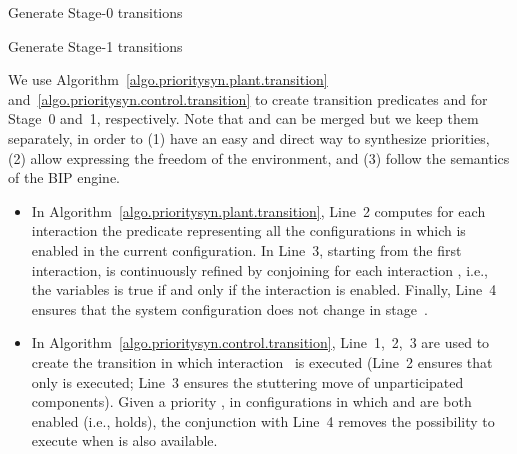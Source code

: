 \documentclass[10pt, a4paper, onecolumn, conference, compsocconf]{IEEEtran}
\begin{document}
\begin{algorithm}[H]
\DontPrintSemicolon
{}
\caption{Generate Stage-0 transitions\label{algo.prioritysyn.plant.transition}}
\end{algorithm}

\begin{algorithm}[H]
\DontPrintSemicolon
{}

\caption{Generate Stage-1 transitions\label{algo.prioritysyn.control.transition}}
\end{algorithm}

We use Algorithm~\ref{algo.prioritysyn.plant.transition}
and~\ref{algo.prioritysyn.control.transition} to create transition
predicates  and  for
Stage~0 and~1, respectively. Note that  and  can be
merged but we keep them separately, in order to
(1) have an easy and direct way to synthesize priorities,
(2) allow expressing the freedom of the environment, and
(3) follow the semantics of the BIP engine.

\begin{itemize}
\item In Algorithm~\ref{algo.prioritysyn.plant.transition},  Line~2
  computes for each interaction  the predicate  representing all the
  configurations in which  is enabled in the current configuration.
In Line~3, starting from the first interaction,
   is continuously refined by conjoining
   for each interaction
  , i.e., the variables  is true if and only if the
  interaction  is enabled.
Finally, Line~4 ensures that
the system configuration does not change in stage~.
\item In Algorithm~\ref{algo.prioritysyn.control.transition},
  Line~1,~2,~3 are used to create the transition in which
  interaction~ is executed (Line~2 ensures that only 
  is executed; Line~3 ensures the stuttering move of unparticipated
  components). Given a priority , in
  configurations in which  and  are both enabled
  (i.e.,  holds), the conjunction with Line~4
  removes the possibility to execute  when  is
  also available.
\end{itemize}
\end{document}
